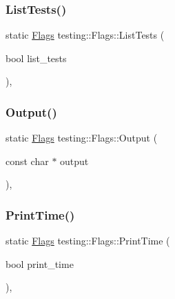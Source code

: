 \mbox{\label{structtesting_1_1_flags_a825a5d763a31fe6c28f543990bd336df}} 
\subsubsection{\texorpdfstring{List\+Tests()}{ListTests()}}
{\footnotesize\ttfamily static \hyperlink{structtesting_1_1_flags}{Flags} testing\+::\+Flags\+::\+List\+Tests (\begin{DoxyParamCaption}\item[{bool}]{list\+\_\+tests }\end{DoxyParamCaption})\hspace{0.3cm}{\ttfamily [inline]}, {\ttfamily [static]}}

\mbox{\label{structtesting_1_1_flags_a507916734a6d7ff2dd02891d7849f2d3}} 
\subsubsection{\texorpdfstring{Output()}{Output()}}
{\footnotesize\ttfamily static \hyperlink{structtesting_1_1_flags}{Flags} testing\+::\+Flags\+::\+Output (\begin{DoxyParamCaption}\item[{const char $\ast$}]{output }\end{DoxyParamCaption})\hspace{0.3cm}{\ttfamily [inline]}, {\ttfamily [static]}}

\mbox{\label{structtesting_1_1_flags_af4dc8454995fb3691399a049e95de179}} 
\subsubsection{\texorpdfstring{Print\+Time()}{PrintTime()}}
{\footnotesize\ttfamily static \hyperlink{structtesting_1_1_flags}{Flags} testing\+::\+Flags\+::\+Print\+Time (\begin{DoxyParamCaption}\item[{bool}]{print\+\_\+time }\end{DoxyParamCaption})\hspace{0.3cm}{\ttfamily [inline]}, {\ttfamily [static]}}

